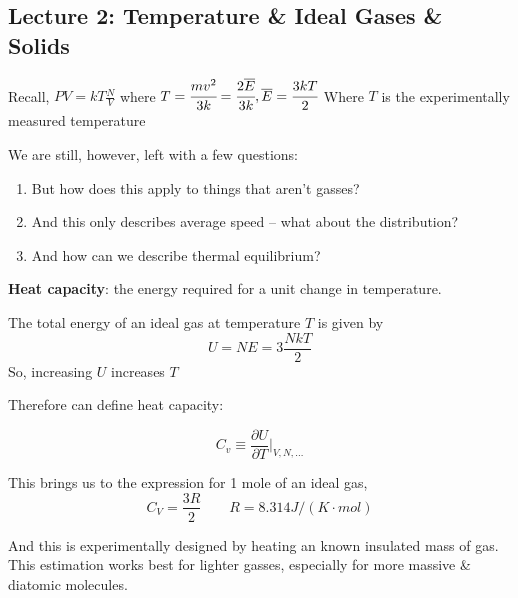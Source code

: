 \documentclass[10pt]{article}
\begin{document}
\subsection{Lecture 2: Temperature \& Ideal Gases \& Solids}

\begin{remark}
	Recall, $ PV = kT \frac{N}{V} $ where $ T = \cfrac{mv^2}{3k} = \cfrac{2\overline{E}}{3k} ,  \overline{E} = \cfrac{3kT}{2} $ 
	Where $ T $  is the experimentally measured temperature
\end{remark}

We are still, however, left with a few questions:
\begin{enumerate}
	\item But how does this apply to things that aren't gasses? 
	\item And this only describes average speed -- what about the distribution? 
	\item And how can we describe thermal equilibrium?
\end{enumerate}

\begin{definition}
	\textbf{Heat capacity}: the energy required for a unit change in temperature.

	\begin{lemma}
		The total energy of an ideal gas at temperature $ T $ is given by
		\begin{equation}
			U = NE = 3\frac{NkT}{2}
		\end{equation}
		So, increasing $ U $  increases $ T $ 
	\end{lemma}

	Therefore can define heat capacity:

	\begin{equation}
		C_v \equiv \frac{\partial U}{\partial T} \biggr |_{V, N, \ldots}
		\label{eq:294:heat_capacity}
	\end{equation}
	
	This brings us to the expression for 1 mole of an ideal gas, 
	\begin{equation}
		C_V = \frac{3R}{2} \qquad R = 8.314 J / (K\cdot mol )
	\end{equation}

\end{definition}

	And this is experimentally designed by heating an known insulated mass of gas.
	This estimation works best for lighter gasses, especially for more massive \& diatomic molecules.
\end{document}
